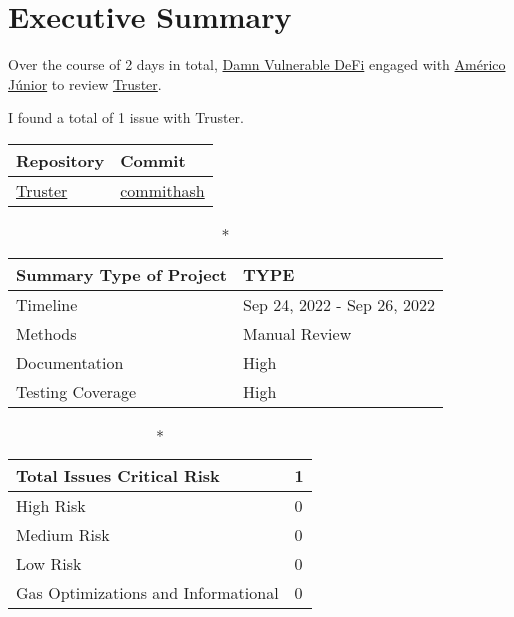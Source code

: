 \hypertarget{executive-summary}{%
\section{Executive Summary}\label{executive-summary}}

Over the course of 2 days in total, \href{https://www.damnvulnerabledefi.xyz}{Damn Vulnerable DeFi} engaged with
\href{https://americojunior.com}{Américo Júnior} to review
\href{https://www.damnvulnerabledefi.xyz/challenges/3.html}{Truster}. 

I found a total of 1 issue with Truster. 

\begin{longtable}[c]{|l|l|}
\hline \textbf{Repository} & \textbf{Commit} \\

\hline
\href{https://www.damnvulnerabledefi.xyz/challenges/3.html}{Truster} &
\href{https://github.com/permalink/commit/commithash}{commithash} \\
\hline
\end{longtable}

\begin{longtable}[]{|l|l|}

\caption*{\textbf{Summary}}
\hline Type of Project & TYPE \\   
\hline Timeline & Sep 24, 2022 - Sep 26, 2022   \\
\hline Methods & Manual Review \\
\hline Documentation & High \\
\hline Testing Coverage & High  \\
\hline
\end{longtable}


\begin{longtable}[]{|l|l|}
\caption*{\textbf{Total Issues}}
\hline Critical Risk & 1 \\
\hline High Risk & 0 \\
\hline Medium Risk & 0 \\ 
\hline Low Risk & 0 \\
\hline Gas Optimizations and Informational & 0 \\
\hline
\end{longtable}

